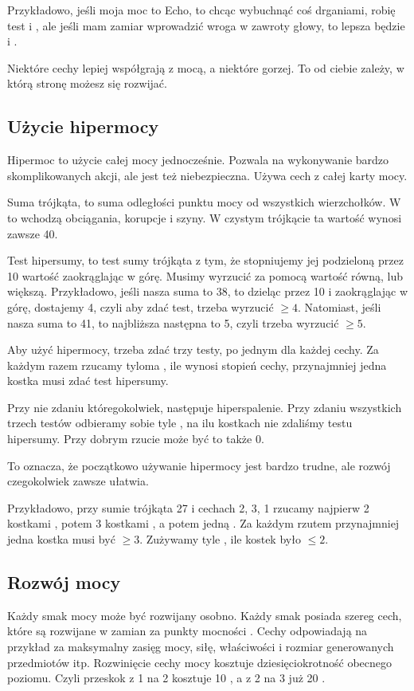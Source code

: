 Przykładowo, jeśli moja moc to Echo, to chcąc wybuchnąć coś drganiami, robię test \absm{} i \abs{}, ale jeśli mam zamiar wprowadzić wroga w zawroty głowy, to lepsza będzie \absm{} i \abp{}.

Niektóre cechy lepiej współgrają z mocą, a niektóre gorzej. To od ciebie zależy, w którą stronę możesz się rozwijać.

\subsection{Użycie hipermocy}
Hipermoc to użycie całej mocy jednocześnie.
Pozwala na wykonywanie bardzo skomplikowanych akcji, ale jest też niebezpieczna.
Używa cech z całej karty mocy.

Suma trójkąta, to suma odległości punktu mocy od wszystkich wierzchołków.
W to wchodzą obciągania, korupcje i szyny. W czystym trójkącie ta wartość wynosi zawsze 40.

Test hipersumy, to test sumy trójkąta z tym, że stopniujemy jej podzieloną przez 10 wartość zaokrąglając w górę.
Musimy wyrzucić za pomocą \dx{} wartość równą, lub większą.
Przykładowo, jeśli nasza suma to 38, to dzieląc przez 10 i zaokrąglając w górę, dostajemy 4, czyli aby zdać test, trzeba wyrzucić $\ge4$.
Natomiast, jeśli nasza suma to 41, to najbliższa następna to 5, czyli trzeba wyrzucić $\ge5$.

Aby użyć hipermocy, trzeba zdać trzy testy, po jednym dla każdej cechy.
Za każdym razem rzucamy tyloma \dx{}, ile wynosi stopień cechy, przynajmniej jedna kostka musi zdać test hipersumy.

Przy nie zdaniu któregokolwiek, następuje hiperspalenie.
Przy zdaniu wszystkich trzech testów odbieramy sobie tyle \abkar{}, na ilu kostkach nie zdaliśmy testu hipersumy. Przy dobrym rzucie może być to także 0.

To oznacza, że początkowo używanie hipermocy jest bardzo trudne, ale rozwój czegokolwiek zawsze ułatwia.

Przykładowo, przy sumie trójkąta 27 i cechach 2, 3, 1 rzucamy najpierw 2 kostkami \dx{}, potem 3 kostkami \dx{}, a potem jedną \dx{}. Za każdym rzutem przynajmniej jedna kostka musi być $\ge3$.
Zużywamy tyle \abkar{}, ile kostek było $\le2$.

\subsection{Rozwój mocy}
Każdy smak mocy może być rozwijany osobno.
Każdy smak posiada szereg cech, które są rozwijane w zamian za punkty mocności \xpmcn{}.
Cechy odpowiadają na przykład za maksymalny zasięg mocy, siłę, właściwości i rozmiar generowanych przedmiotów itp.
Rozwinięcie cechy mocy kosztuje dziesięciokrotność \xpmcn{} obecnego poziomu.
Czyli przeskok z 1 na 2 kosztuje 10 \xpmcn{}, a z 2 na 3 już 20 \xpmcn{}.

